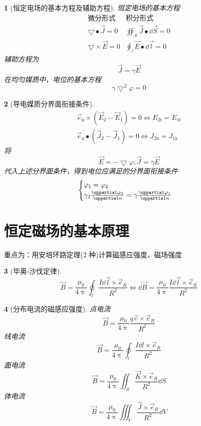 \documentclass{book}
\theoremstyle{change}
\newtheorem{ti}{}[section]
\def\partial{\uppartial}
\begin{document}
\begin{ti}[恒定电场的基本方程及辅助方程]
恒定电场的基本方程
\[
\begin{matrix}
\text{微分形式}&\text{积分形式}\\
\bigtriangledown\bullet\vec{J}=0&\oiint_{S}{\vec{J}\bullet\dd \vec{S}}=0\\
\bigtriangledown\times\vec{E}=0&\oint_l{\vec{E}\bullet\dd \vec{l}}=0
\end{matrix}
\]
辅助方程为
\[
	\vec{J}=\gamma\vec{E}
\]
在均匀媒质中，电位的基本方程
\[
	\gamma\bigtriangledown^2\varphi=0
\]
\end{ti}

\begin{ti}[导电媒质分界面衔接条件]
\begin{gather*}
	\vec{e}_{\mathrm{n}}\times(\vec{E}_2-\vec{E}_1)=0\Leftrightarrow E_{2\text{t}}=E_{1\text{t}}\\
	\vec{e}_\mathrm{n}\bullet(\vec{J}_2-\vec{J}_1)=0\Leftrightarrow J_{2\mathrm{n}}=J_{1\mathrm{n}}
\end{gather*}
将
\[
	\vec{E}=-\bigtriangledown\varphi,\vec{J}=\gamma\vec{E}
\]
代入上述分界面条件，得到电位应满足的分界面衔接条件
\[
\begin{cases}
\varphi_1=\varphi_2\\
\gamma_2\frac{\partial\varphi_2}{\partial n}=\gamma\frac{\partial\varphi_1}{\partial n}
\end{cases}
\]
\end{ti}

\section{恒定磁场的基本原理}
重点为：用安培环路定理($2$ 种)计算磁感应强度、磁场强度
\begin{ti}[毕奥-沙伐定律]
\[
	\vec{B}=\frac{\mu_0}{4\uppi}\oint_l{\frac{I\dd \vec{l}\times\vec{e}_R}{R^2}}\Leftrightarrow\dd \vec{B}=\frac{\mu_0}{4\uppi}\frac{I\dd \vec{l}\times\vec{e}_R}{R^2}
\]
\end{ti}

\begin{ti}[分布电流的磁感应强度]
点电流
\[
	\vec{B}=\frac{\mu_0}{4\uppi}\frac{q\vec{v}\times\vec{e}_R}{R^2}
\]
线电流
\[
	\vec{B}=\frac{\mu_0}{4\uppi}\oint_l\frac{I\dd l\times\vec{e}_R}{R^2}
\]
面电流
\[
	\vec{B}=\frac{\mu_0}{4\uppi}\iint_S\frac{\vec{K}\times\vec{e}_R}{R^2}\dd S
\]
体电流
\[
	\vec{B}=\frac{\mu_0}{4\uppi}\iiint_{V}\frac{\vec{J}\times\vec{e}_R}{R^2}\dd V
\]
\end{ti}
\end{document}
